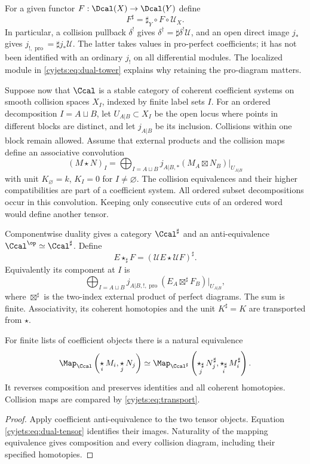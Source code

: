 For a given functor $F:\Dcal(X)\to\Dcal(Y)$ define
\begin{equation}\label{cyjets:eq:transport}
 F^\sharp=\sharp_Y\circ F\circ\mathcal U_X.
\end{equation}
In particular, a collision pullback $\delta^!$ gives
$\delta^\dagger=\sharp\delta^!\mathcal U$, and an open direct
image $j_*$ gives $j_{!,\operatorname{pro}}=\sharp j_*\mathcal U$.
The latter takes values in pro-perfect coefficients; it has not
been identified with an ordinary $j_!$ on all differential modules.
The localized module in \eqref{cyjets:eq:dual-tower} explains why
retaining the pro-diagram matters.

Suppose now that $\Ccal$ is a stable category of coherent coefficient
systems on smooth collision spaces $X_I$, indexed by finite label
sets $I$. For an ordered decomposition $I=A\sqcup B$, let
$U_{A|B}\subset X_I$ be the open locus where points in different
blocks are distinct, and let $j_{A|B}$ be its inclusion.
Collisions within one block remain allowed. Assume that external
products and the collision maps define an associative convolution
\[
 (M\star N)_I=
 \bigoplus_{I=A\sqcup B}j_{A|B,*}
           (M_A\boxtimes N_B)|_{U_{A|B}}
\]
with unit $K_\varnothing=k$, $K_I=0$ for $I\ne\varnothing$.
The collision equivalences and their higher compatibilities are
part of a coefficient system. All ordered subset decompositions
occur in this convolution. Keeping only consecutive cuts of an
ordered word would define another tensor.

Componentwise duality gives a category $\Ccal^\sharp$ and an
anti-equivalence $\Ccal^{\op}\simeq\Ccal^\sharp$. Define
\begin{equation}\label{cyjets:eq:dual-tensor}
 E\star_\sharp F=(\mathcal UE\star\mathcal UF)^\sharp.
\end{equation}
Equivalently its component at $I$ is
\[
 \bigoplus_{I=A\sqcup B}j_{A|B,!,\operatorname{pro}}
                 (E_A\boxtimes^\sharp F_B)|_{U_{A|B}},
\]
where $\boxtimes^\sharp$ is the two-index external product of
perfect diagrams. The sum is finite. Associativity, its coherent
homotopies and the unit $K^\sharp=K$ are transported from $\star$.

\begin{proposition}\label{cyjets:prop:operations}
For finite lists of coefficient objects there is a natural equivalence
\[
 \Map_{\Ccal}\left(\mathop{\star}_iM_i,\mathop{\star}_jN_j\right)
 \simeq
 \Map_{\Ccal^\sharp}
       \left(\mathop{\star_\sharp}_jN_j^\sharp,
             \mathop{\star_\sharp}_iM_i^\sharp\right).
\]
It reverses composition and preserves identities and all coherent
homotopies. Collision maps are compared by
\eqref{cyjets:eq:transport}.
\end{proposition}
\begin{proof}
Apply coefficient anti-equivalence to the two tensor objects.
Equation \eqref{cyjets:eq:dual-tensor} identifies their images.
Naturality of the mapping equivalence gives composition and every
collision diagram, including their specified homotopies.
\end{proof}

